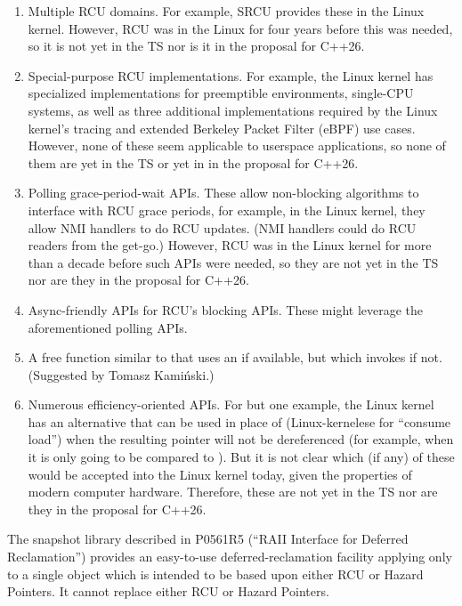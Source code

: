 \begin{enumerate}
\item	Multiple RCU domains.
	For example, SRCU provides these in the Linux kernel.
	However, RCU was in the Linux for four years before
	this was needed, so it is not yet in the TS nor is it
	in the proposal for C++26.
\item	Special-purpose RCU implementations.
	For example, the Linux kernel has specialized implementations
	for preemptible environments, single-CPU systems,
	as well as three additional implementations required by
	the Linux kernel's tracing and extended Berkeley Packet
	Filter (eBPF) use cases.
	However, none of these seem applicable to userspace applications,
	so none of them are yet in the TS or yet in in the proposal
	for C++26.
\item	Polling grace-period-wait APIs.
	These allow non-blocking algorithms to interface with RCU
	grace periods, for example, in the Linux kernel, they allow
	NMI handlers to do RCU updates.
	(NMI handlers could do RCU readers from the get-go.)
	However, RCU was in the Linux kernel for more than a decade
	before such APIs were needed, so they are not yet in the
	TS nor are they in the proposal for C++26.
\item	Async-friendly APIs for RCU's blocking APIs.
	These might leverage the aforementioned polling APIs.
\item	A free function similar to  that uses
	an  if available, but which invokes
	 if not.
	(Suggested by Tomasz Kami\'{n}ski.)
\item	Numerous efficiency-oriented APIs.
	For but one example, the Linux kernel has an alternative
	 that can be used in place
	of  (Linux-kernelese for ``consume load'')
	when the resulting pointer will not be dereferenced
	(for example, when it is only going to be compared to ).
	But it is not clear which (if any) of these would be accepted
	into the Linux kernel today, given the properties of modern
	computer hardware.
	Therefore, these are not yet in the TS nor are they in the
	proposal for C++26.
\end{enumerate}

The snapshot library described in P0561R5 (``RAII Interface for Deferred
Reclamation'') provides an easy-to-use deferred-reclamation facility
applying only to a single object which is intended to be based upon
either RCU or Hazard Pointers.
It cannot replace either RCU or Hazard Pointers.

